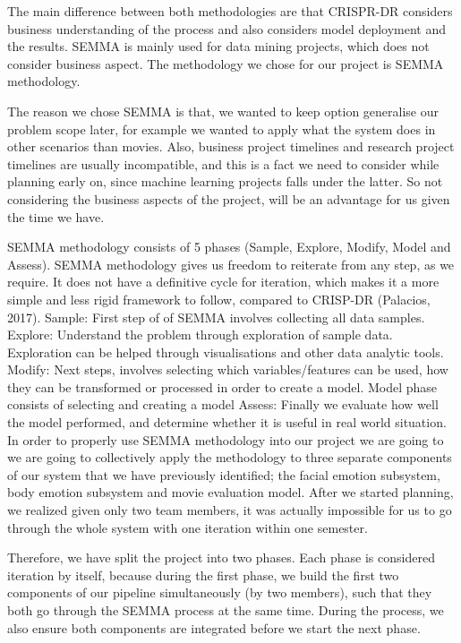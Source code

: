 \documentclass[12pt,a4paper,man]{report}
\begin{document}
The main difference between both methodologies are that CRISPR-DR considers business understanding of the process and also considers model deployment and the results. SEMMA is mainly used for data mining projects, which does not consider business aspect. The methodology we chose for our project is SEMMA methodology.

The reason we chose SEMMA is that, we wanted to keep option generalise our problem scope later, for example we wanted to apply what the system does in other scenarios than movies. Also, business project timelines and research project timelines are usually incompatible, and this is a fact we need to consider while planning early on, since machine learning projects falls under the latter. So not considering the business aspects of the project, will be an advantage for us given the time we  have. 

SEMMA methodology consists of 5 phases (Sample, Explore, Modify, Model and Assess). SEMMA methodology gives us freedom to reiterate from any step, as we require. It does not have a definitive cycle for iteration, which makes it a more simple and less rigid framework to follow, compared to CRISP-DR (Palacios, 2017). 
Sample:  First step of of SEMMA involves collecting all data samples.
Explore: Understand the problem through exploration of sample data. Exploration can be helped through visualisations and other data analytic tools.
Modify: Next steps, involves selecting which variables/features can be used, how they can be transformed or processed in order to create a model.
Model phase consists of selecting and creating a model
Assess: Finally we evaluate how well the model performed, and determine whether it is useful in real world situation.
In order to properly use SEMMA methodology into our project we are going to we are going to collectively apply the methodology to three separate components of our system that we have previously identified; the facial emotion subsystem, body emotion subsystem and movie evaluation model. After we started planning, we realized given only two team members, it was actually impossible for us to go through the whole system with one iteration within one semester. 

Therefore, we have split the project into two phases. Each phase is considered iteration by itself, because during the first phase, we build the first two components of our pipeline simultaneously (by two members), such that they both go through the SEMMA process at the same time. During the process, we also ensure both components are integrated before we start the next phase.
\end{document}
